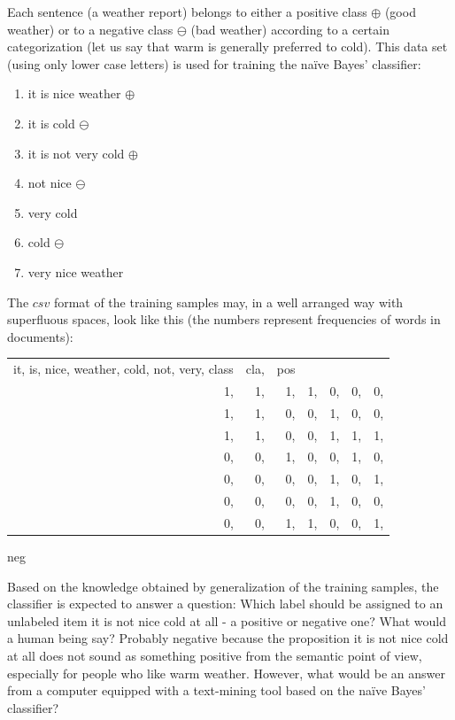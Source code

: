 \documentclass[10pt]{book}
\begin{document}
Each sentence (a weather report) belongs to either a positive class $\oplus$ (good weather) or to a negative class $\ominus$ (bad weather) according to a certain categorization (let us say that warm is generally preferred to cold). This data set (using only lower case letters) is used for training the naïve Bayes' classifier:

\begin{enumerate}
  \item it is nice weather $\oplus$
  \item it is cold $\ominus$
  \item it is not very cold $\oplus$
  \item not nice $\ominus$
  \item very cold
  \item cold $\ominus$
  \item very nice weather
\end{enumerate}

The $c s v$ format of the training samples may, in a well arranged way with superfluous spaces, look like this (the numbers represent frequencies of words in documents):

\begin{center}
\begin{tabular}{rrrrrrr}
it, is, nice, weather, cold, not, very, class & cla, & pos &  &  &  &  \\
1, & 1, & 1, & 1, & 0, & 0, & 0, \\
1, & 1, & 0, & 0, & 1, & 0, & 0, \\
1, & 1, & 0, & 0, & 1, & 1, & 1, \\
0, & 0, & 1, & 0, & 0, & 1, & 0, \\
0, & 0, & 0, & 0, & 1, & 0, & 1, \\
0, & 0, & 0, & 0, & 1, & 0, & 0, \\
0, & 0, & 1, & 1, & 0, & 0, & 1, \\
\end{tabular}
\end{center} neg

Based on the knowledge obtained by generalization of the training samples, the classifier is expected to answer a question: Which label should be assigned to an unlabeled item it is not nice cold at all - a positive or negative one? What would a human being say? Probably negative because the proposition it is not nice cold at all does not sound as something positive from the semantic point of view, especially for people who like warm weather. However, what would be an answer from a computer equipped with a text-mining tool based on the naïve Bayes' classifier?
\end{document}
